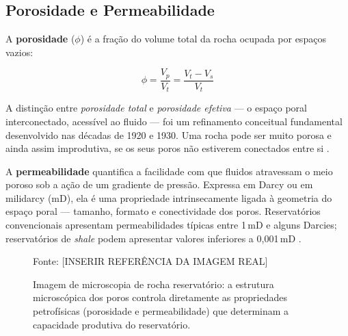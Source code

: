\documentclass[
  12pt,
  a4paper,
  oneside,
  brazilian,
  sumario=tradicional
]{abntex2}
\renewcommand{\fonte}[1]{\vspace{2pt}\par\noindent\footnotesize Fonte: #1}
\begin{document}
\subsection{Porosidade e Permeabilidade}

A \textbf{porosidade} ($\phi$) é a fração do volume total da rocha
ocupada por espaços vazios:

\begin{equation}
  \phi = \frac{V_p}{V_t} = \frac{V_t - V_s}{V_t}
  \label{eq:poro}
\end{equation}

A distinção entre \textit{porosidade total} e \textit{porosidade
efetiva} — o espaço poral interconectado, acessível ao fluido — foi
um refinamento conceitual fundamental desenvolvido nas décadas de 1920
e 1930. Uma rocha pode ser muito porosa e ainda assim improdutiva, se
os seus poros não estiverem conectados entre si \cite{alyafei2019}.

A \textbf{permeabilidade} quantifica a facilidade com que fluidos
atravessam o meio poroso sob a ação de um gradiente de pressão.
Expressa em Darcy ou em milidarcy (mD), ela é uma propriedade
intrinsecamente ligada à geometria do espaço poral — tamanho, formato
e conectividade dos poros. Reservatórios convencionais apresentam
permeabilidades típicas entre 1\,mD e alguns Darcies; reservatórios
de \textit{shale} podem apresentar valores inferiores a 0{,}001\,mD
\cite{javadpour2009}.

\begin{figure}[H]
  \centering
  \caption{Imagem de microscopia de rocha reservatório: a estrutura microscópica dos poros controla diretamente as propriedades petrofísicas (porosidade e permeabilidade) que determinam a capacidade produtiva do reservatório.}
  \label{fig:microscopio_rocha}
  \fonte{[INSERIR REFERÊNCIA DA IMAGEM REAL]}
\end{figure}
\end{document}
